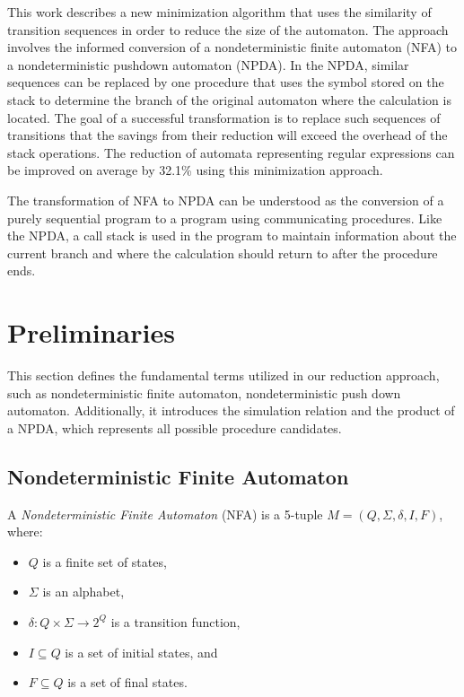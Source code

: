     This work describes a new minimization algorithm that uses the similarity of transition sequences in order to reduce the size of the automaton. The approach involves the informed conversion of a nondeterministic finite automaton (NFA) to a nondeterministic pushdown automaton (NPDA). In the NPDA, similar sequences can be replaced by one procedure that uses the symbol stored on the stack to determine the branch of the original automaton where the calculation is located. The goal of a successful transformation is to replace such sequences of transitions that the savings from their reduction will exceed the overhead of the stack operations. The reduction of automata representing regular expressions can be improved on average by 32.1\% using this minimization approach.

    The transformation of NFA to NPDA can be understood as the conversion of a purely sequential program to a program using communicating procedures. Like the NPDA, a call stack is used in the program to maintain information about the current branch and where the calculation should return to after the procedure ends.

\section{Preliminaries}
    This section defines the fundamental terms utilized in our reduction approach, such as nondeterministic finite automaton, nondeterministic push down automaton. Additionally, it introduces the simulation relation and the product of a NPDA, which represents all possible procedure candidates.

    \subsection{Nondeterministic Finite Automaton}
        A \textit{Nondeterministic Finite Automaton} (NFA) is a 5-tuple $M = (Q, \Sigma, \delta, I, F)$, where:
        \begin{itemize}
            \item $Q$ is a finite set of states,
            \item $\Sigma$ is an alphabet,
            \item $\delta : Q \times \Sigma \rightarrow 2^Q$ is a transition function,
            \item $I \subseteq Q$ is a set of initial states, and
            \item $F \subseteq Q$ is a set of final states.
        \end{itemize}

